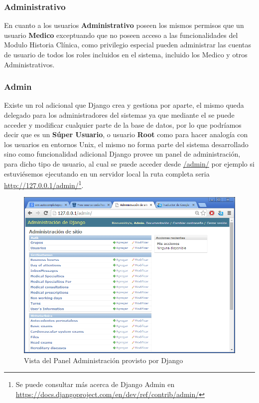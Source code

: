 \subsubsection{Administrativo}

En cuanto a los usuarios \textbf{Administrativo} poseen los mismos permisos que un usuario \textbf{Medico} exceptuando que no poseen acceso a las funcionalidades del Modulo Historia Clínica, como privilegio especial pueden administrar las cuentas de usuario de todos los roles incluidos en el sistema, incluido los 
Medico y otros Administrativos.

\subsubsection{Admin}

Existe un rol adicional que Django crea y gestiona por aparte, el mismo queda delegado para los administradores del sistemas ya que mediante el se puede acceder y modificar cualquier parte de la base de datos, por lo que podríamos decir que es un \textbf{Súper Usuario}, o usuario \textbf{Root} como para hacer analogía con los usuarios en entornos Unix, el mismo no forma parte del sistema desarrollado sino como funcionalidad adicional Django provee un panel de administración, para dicho tipo de usuario, al cual se puede acceder desde \url{/admin/} por ejemplo si estuviésemos ejecutando en un servidor local la ruta completa seria \url{http://127.0.0.1/admin/}\footnote{Se puede consultar más acerca de Django
Admin en \url{https://docs.djangoproject.com/en/dev/ref/contrib/admin/}}.\\[0.1cm]


\begin{figure}[h]
    \centering
    \includegraphics[scale=0.5]{resourse/django-admin.png}
    \caption{Vista del Panel Administración provisto por Django}
    \label{fig:123}
\end{figure}  


